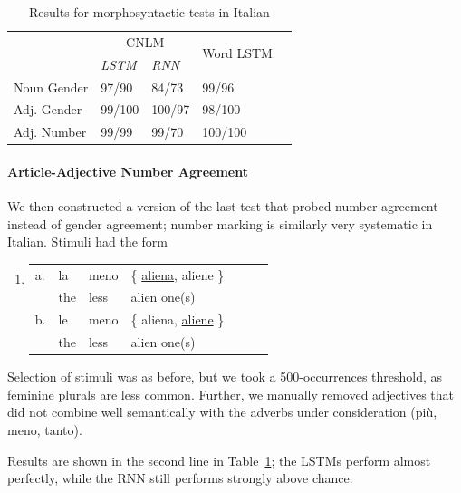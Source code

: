 \begin{table}[t]
  \begin{center}
    \begin{tabular}{l|l|l|l|l}
	    & \multicolumn{2}{c|}{CNLM} & \multirow{2}{*}{Word LSTM}\\
  &\emph{LSTM}&\emph{RNN}&\\ \hline
	    Noun Gender & 97/90  & 84/73 & 99/96 \\
	    Adj. Gender & 99/100 & 100/97 & 98/100 \\
	    Adj. Number & 99/99 & 99/70 & 100/100 \\
    \end{tabular}
  \end{center}
  \caption{\label{tab:ital-agr-results} Results for morphosyntactic tests in Italian}
\end{table}

\paragraph{Article-Adjective Number Agreement}
We then constructed a version of the last test that probed number agreement instead of gender agreement; number marking is similarly very systematic in Italian.
Stimuli had the form
\begin{enumerate}[label={(\arabic*)}]
	\item 
\begin{tabular}[t]{lllllll}
	a. & la & meno & \{ \underline{aliena}, aliene \} \\
   &  the & less & alien one(s)  \\
	b. & le & meno & \{ aliena, \underline{aliene} \} \\
    &the & less & alien one(s) \\
\end{tabular}
\end{enumerate}
Selection of stimuli was  as before, but  we took a 500-occurrences threshold, as feminine plurals are less common.
Further, we manually removed adjectives that did not combine well semantically with the adverbs under consideration (pi{\`u}, meno, tanto).

Results are shown in the second line in Table~\ref{tab:ital-agr-results}; the LSTMs perform almost perfectly, while the RNN still performs strongly above chance.



